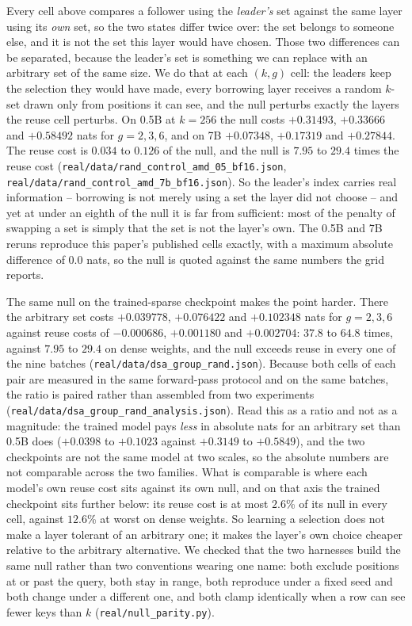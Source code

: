 \documentclass[10pt]{article}
\begin{document}
Every cell above compares a follower using the \emph{leader's} set against the
same layer using its \emph{own} set, so the two states differ twice over: the
set belongs to someone else, and it is not the set this layer would have
chosen. Those two differences can be separated, because the leader's set is
something we can replace with an arbitrary set of the same size. We do that at
each $(k,g)$ cell: the leaders keep the selection they would have made, every
borrowing layer receives a random $k$-set drawn only from positions it can see, and the null
perturbs exactly the layers the reuse cell perturbs. On 0.5B at $k{=}256$ the
null costs $+0.31493$, $+0.33666$ and $+0.58492$ nats for $g{=}2,3,6$, and on
7B $+0.07348$, $+0.17319$ and $+0.27844$. The reuse cost is $0.034$ to $0.126$
of the null, and the null is $7.95$ to $29.4$ times the reuse cost
(\texttt{real/data/rand\_control\_amd\_05\_bf16.json},
\texttt{real/data/rand\_control\_amd\_7b\_bf16.json}). So the leader's index
carries real information -- borrowing is not merely using a set the layer did
not choose -- and yet at under an eighth of the null it is far from
sufficient: most of the penalty of swapping a set is simply that the set is
not the layer's own. The 0.5B and 7B reruns reproduce this paper's published
cells exactly, with a maximum absolute difference of $0.0$ nats, so the null is
quoted against the same numbers the grid reports.

The same null on the trained-sparse checkpoint makes the point harder. There
the arbitrary set costs $+0.039778$, $+0.076422$ and $+0.102348$ nats for
$g{=}2,3,6$ against reuse costs of $-0.000686$, $+0.001180$ and $+0.002704$:
$37.8$ to $64.8$ times, against $7.95$ to $29.4$ on dense weights, and the null
exceeds reuse in every one of the nine batches
(\texttt{real/data/dsa\_group\_rand.json}). Because both cells of each pair are
measured in the same forward-pass protocol and on the same batches, the ratio is
paired rather than assembled from two experiments
(\texttt{real/data/dsa\_group\_rand\_analysis.json}). Read this as a ratio and
not as a magnitude: the trained model pays \emph{less} in absolute nats for an
arbitrary set than 0.5B does ($+0.0398$ to $+0.1023$ against $+0.3149$ to
$+0.5849$), and the two checkpoints are not the same model at two scales, so the
absolute numbers are not comparable across the two families. What is comparable
is where each model's own reuse cost sits against its own null, and on that axis
the trained checkpoint sits further below: its reuse cost is at most $2.6$\% of
its null in every cell, against $12.6$\% at worst on dense weights. So learning
a selection does not make a layer tolerant of an arbitrary one; it makes the
layer's own choice cheaper relative to the arbitrary alternative. We checked
that the two harnesses build the same null rather than two conventions wearing
one name: both exclude positions at or past the query, both
stay in range, both reproduce under a fixed seed and both change under a
different one, and both clamp identically when a row can see fewer keys than
$k$ (\texttt{real/null\_parity.py}).
\end{document}
